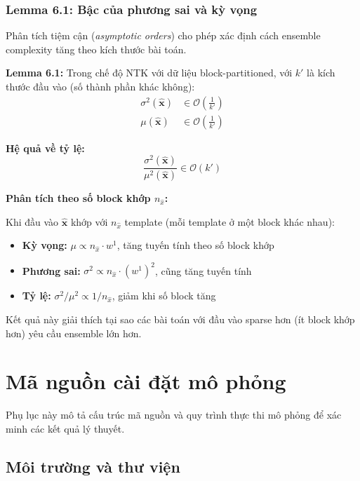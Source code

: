 \subsection{Lemma 6.1: Bậc của phương sai và kỳ vọng}

Phân tích tiệm cận (\textit{asymptotic orders}) cho phép xác định cách ensemble complexity tăng theo kích thước bài toán.

\textbf{Lemma 6.1:} Trong chế độ NTK với dữ liệu block-partitioned, với $k'$ là kích thước đầu vào (số thành phần khác không):
\begin{align}
    \sigma^2(\hat{\mathbf{x}}) &\in \mathcal{O}\left(\frac{1}{k'}\right) \\
    \mu(\hat{\mathbf{x}}) &\in \mathcal{O}\left(\frac{1}{k'}\right)
\end{align}

\textbf{Hệ quả về tỷ lệ:}
\begin{equation}
    \frac{\sigma^2(\hat{\mathbf{x}})}{\mu^2(\hat{\mathbf{x}})} \in \mathcal{O}(k')
\end{equation}

\textbf{Phân tích theo số block khớp $n_{\hat{x}}$:}

Khi đầu vào $\hat{\mathbf{x}}$ khớp với $n_{\hat{x}}$ template (mỗi template ở một block khác nhau):
\begin{itemize}
    \item \textbf{Kỳ vọng:} $\mu \propto n_{\hat{x}} \cdot w^1$, tăng tuyến tính theo số block khớp
    \item \textbf{Phương sai:} $\sigma^2 \propto n_{\hat{x}} \cdot (w^1)^2$, cũng tăng tuyến tính
    \item \textbf{Tỷ lệ:} $\sigma^2/\mu^2 \propto 1/n_{\hat{x}}$, giảm khi số block tăng
\end{itemize}

Kết quả này giải thích tại sao các bài toán với đầu vào sparse hơn (ít block khớp hơn) yêu cầu ensemble lớn hơn.

\chapter{Mã nguồn cài đặt mô phỏng}

Phụ lục này mô tả cấu trúc mã nguồn và quy trình thực thi mô phỏng để xác minh các kết quả lý thuyết.

\section{Môi trường và thư viện}

